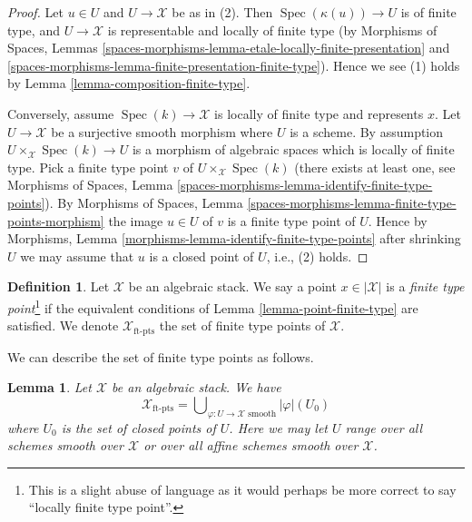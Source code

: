\documentclass{stacks-project}
\theoremstyle{plain}
\newtheorem{lemma}[subsection]{Lemma}
\theoremstyle{definition}
\newtheorem{definition}[subsection]{Definition}
\theoremstyle{remark}
\numberwithin{equation}{subsection}
\def\Spec{\mathop{\mathrm{Spec}}}
\begin{document}
\begin{proof}
Let $u \in U$ and $U \to \mathcal{X}$ be as in (2). Then
$\Spec(\kappa(u)) \to U$ is of finite type, and $U \to \mathcal{X}$ is
representable and locally of finite type (by
Morphisms of Spaces,
Lemmas \ref{spaces-morphisms-lemma-etale-locally-finite-presentation} and
\ref{spaces-morphisms-lemma-finite-presentation-finite-type}).
Hence we see (1) holds by
Lemma \ref{lemma-composition-finite-type}.

\medskip\noindent
Conversely, assume $\Spec(k) \to \mathcal{X}$ is locally of finite type
and represents $x$. Let $U \to \mathcal{X}$ be a surjective smooth morphism
where $U$ is a scheme. By assumption
$U \times_\mathcal{X} \Spec(k) \to U$ is a morphism of algebraic
spaces which is locally of finite type. Pick a finite type point $v$ of
$U \times_\mathcal{X} \Spec(k)$ (there exists at least one, see
Morphisms of Spaces,
Lemma \ref{spaces-morphisms-lemma-identify-finite-type-points}).
By
Morphisms of Spaces,
Lemma \ref{spaces-morphisms-lemma-finite-type-points-morphism}
the image $u \in U$ of $v$ is a finite type point of $U$.
Hence by
Morphisms, Lemma \ref{morphisms-lemma-identify-finite-type-points}
after shrinking $U$ we may assume that $u$ is a closed point of $U$, i.e.,
(2) holds.
\end{proof}

\begin{definition}
\label{definition-finite-type-point}
Let $\mathcal{X}$ be an algebraic stack. We say a point $x \in |\mathcal{X}|$
is a {\it finite type point}\footnote{This is a
slight abuse of language as it would perhaps be more correct to say
``locally finite type point''.} if the equivalent conditions of
Lemma \ref{lemma-point-finite-type}
are satisfied. We denote $\mathcal{X}_{\text{ft-pts}}$
the set of finite type points of $\mathcal{X}$.
\end{definition}

\noindent
We can describe the set of finite type points as follows.

\begin{lemma}
\label{lemma-identify-finite-type-points}
Let $\mathcal{X}$ be an algebraic stack. We have
$$
\mathcal{X}_{\text{ft-pts}} =
\bigcup\nolimits_{\varphi : U \to \mathcal{X}\text{ smooth}} |\varphi|(U_0)
$$
where $U_0$ is the set of closed points of $U$.
Here we may let $U$ range over all schemes smooth over $\mathcal{X}$
or over all affine schemes smooth over $\mathcal{X}$.
\end{lemma}
\end{document}
